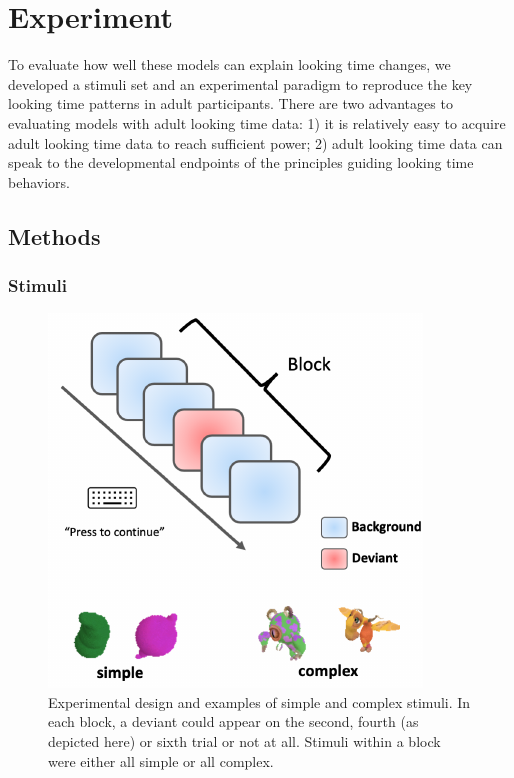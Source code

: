 \documentclass[10pt, letterpaper]{article}
\newenvironment{CodeChunk}{}{}
\begin{document}
\hypertarget{experiment}{%
\section{Experiment}\label{experiment}}

To evaluate how well these models can explain looking time changes, we
developed a stimuli set and an experimental paradigm to reproduce the
key looking time patterns in adult participants. There are two
advantages to evaluating models with adult looking time data: 1) it is
relatively easy to acquire adult looking time data to reach sufficient
power; 2) adult looking time data can speak to the developmental
endpoints of the principles guiding looking time behaviors.

\hypertarget{methods}{%
\subsection{Methods}\label{methods}}

\hypertarget{stimuli}{%
\subsubsection{Stimuli}\label{stimuli}}

\begin{CodeChunk}
\begin{figure}[h]

{\centering \includegraphics{figs/experimental_design-1} 

}

\caption[Experimental design and examples of simple and complex stimuli]{Experimental design and examples of simple and complex stimuli. In each block, a deviant could appear on the second, fourth (as depicted here) or sixth trial or not at all. Stimuli within a block were either all simple or all complex.}\label{fig:experimental_design}
\end{figure}
\end{CodeChunk}
\end{document}
